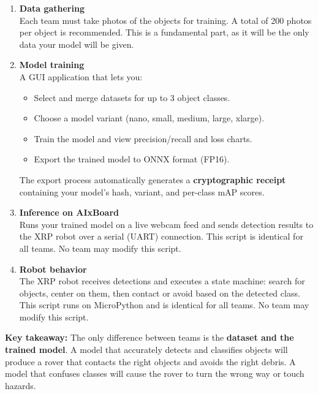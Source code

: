 \documentclass[a4]{article}
\begin{document}
\begin{enumerate}
    \item \textbf{Data gathering}\\
    Each team must take photos of the objects for training. A total of 200 photos per object is recommended. This is a fundamental part, as it will be the only data your model will be given. 

    \item \textbf{Model training}  \\
    A GUI application that lets you:
    \begin{itemize}
        \item Select and merge datasets for up to 3 object classes.
        \item Choose a model variant (nano, small, medium, large, xlarge).
        \item Train the model and view precision/recall and loss charts.
        \item Export the trained model to ONNX format (FP16).
    \end{itemize}
    The export process automatically generates a \textbf{cryptographic receipt} containing your model's hash, variant, and per-class mAP scores.

    \item \textbf{Inference on AIxBoard}  \\
    Runs your trained model on a live webcam feed and sends detection results to the XRP robot over a serial (UART) connection. This script is identical for all teams. No team may modify this script. 

    \item \textbf{Robot behavior} \\
    The XRP robot receives detections and executes a state machine: search for objects, center on them, then contact or avoid based on the detected class. This script runs on MicroPython and is identical for all teams. No team may modify this script. 
\end{enumerate}

\begin{framed}
\textbf{Key takeaway:} The only difference between teams is the \textbf{dataset and the trained model}. A model that accurately detects and classifies objects will produce a rover that contacts the right objects and avoids the right debris. A model that confuses classes will cause the rover to turn the wrong way or touch hazards.
\end{framed}
\end{document}

